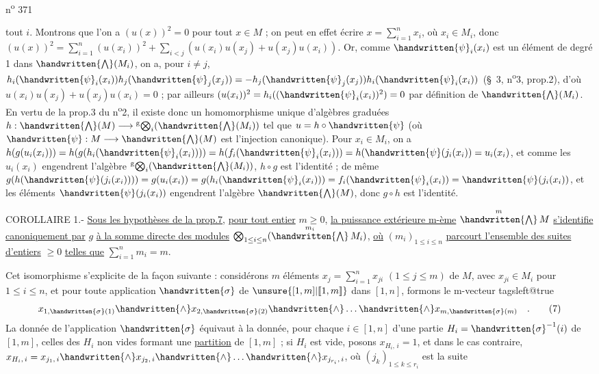 n\textsuperscript{o} 371

tout $i$. Montrons que l'on a $(u(x))^2=0$ pour tout $x\in M$ ; on peut en effet écrire $x=\sum_{i=1}^{n}x_i$, où $x_i\in M_i$, donc $(u(x))^2=\sum_{i=1}^{n}(u(x_i))^2+\sum_{i<j}(u(x_i)u(x_j)+u(x_j)u(x_i))$.
Or, comme $\handwritten{\psi}_i(x_i)$ est un élément de degré 1 dans $\handwritten{\bigwedge}(M_i)$, on a, pour $i\ne j$, $h_i(\handwritten{\psi}_i(x_i))h_j(\handwritten{\psi}_j(x_j))=-h_j(\handwritten{\psi}_j(x_j))h_i(\handwritten{\psi}_i(x_i))$ (\S~3, n\textsuperscript{o}3, prop.2), d'où $u(x_i)u(x_j)+u(x_j)u(x_i)=0$ ; par ailleurs $(u(x_i))^2=h_i((\handwritten{\psi}_i(x_i))^2)=0$ par définition de $\handwritten{\bigwedge}(M_i)$. En vertu de la prop.3 du n\textsuperscript{o}2, il existe donc un homomorphisme unique d'algèbres graduées
$h:\handwritten{\bigwedge}(M)\longrightarrow {}^{\mathrm g}\!\bigotimes_i(\handwritten{\bigwedge}(M_i))$ tel que $u=h\circ\handwritten{\psi}$ (où $\handwritten{\psi}:M\longrightarrow\handwritten{\bigwedge}(M)$ est l'injection canonique). Pour $x_i\in M_i$, on a
$h(g(u_i(x_i)))=h(g(h_i(\handwritten{\psi}_i(x_i))))=h(f_i(\handwritten{\psi}_i(x_i)))=h(\handwritten{\psi}(j_i(x_i))=u_i(x_i)$, et comme les $u_i(x_i)$ engendrent l'algèbre $ {}^{\mathrm g}\!\bigotimes_i(\handwritten{\bigwedge}(M_i))$, $h\circ g$ est l'identité ; de même $g(h(\handwritten{\psi}(j_i(x_i))))=g(u_i(x_i))=g(h_i(\handwritten{\psi}_i(x_i)))=f_i(\handwritten{\psi}_i(x_i))=\handwritten{\psi}(j_i(x_i))$, et les éléments $\handwritten{\psi}(j_i(x_i))$ engendrent l'algèbre $\handwritten{\bigwedge}(M)$, donc $g\circ h$ est l'identité.

COROLLAIRE 1.- \uline{Sous les hypothèses de la prop.7}, \uline{pour tout entier} $m\geq 0$, \uline{la puissance extérieure m-ème} $\overset{m}{\handwritten{\bigwedge}}\,M$ \uline{s'identifie canoniquement par} $g$ \uline{à la somme directe des modules} $\bigotimes_{1\leq i\leq n}(\overset{m_i}{\handwritten{\bigwedge}}\,M_i)$, \uline{où} $(m_i)_{1\leq i\leq n}$ \uline{parcourt l'ensemble des suites d'entiers} $\geq 0$ \uline{telles que} $\sum_{i=1}^{n}m_i=m$.

Cet isomorphisme s'explicite de la façon suivante : considérons $m$ éléments $x_j=\sum_{i=1}^{n}x_{ji}$ $(1\leq j\leq m)$ de $M$, avec $x_{ji}\in M_i$ pour $1\leq i\leq n$, et pour toute application $\handwritten{\sigma}$ de $\unsure{[1,m]|[\![1,m]\!]}$ dans $[1,n]$, formons le m-vecteur
\begingroup\csname tagsleft@true\endcsname
\[
 x_{1,\handwritten{\sigma}(1)}\handwritten{\wedge} x_{2,\handwritten{\sigma}(2)}\handwritten{\wedge}\ldots\handwritten{\wedge} x_{m,\handwritten{\sigma}(m)}\quad .\tag*{(7)}
\]
\endgroup
La donnée de l'application $\handwritten{\sigma}$ équivaut à la donnée, pour chaque $i\in[1,n]$ d'une partie $H_i=\handwritten{\sigma}^{-1}(i)$ de $[1,m]$, celles des $H_i$ non vides formant une \uline{partition} de $[1,m]$ ; si $H_i$ est vide, posons $x_{H_i,\,i}=1$, et dans le cas contraire, $x_{H_i,\,i}=x_{j_1,\,i}\handwritten{\wedge} x_{j_2,\,i}\handwritten{\wedge}\ldots\handwritten{\wedge} x_{j_{r_i},\,i}$, où $(j_k)_{1\leq k\leq r_i}$ est la suite

